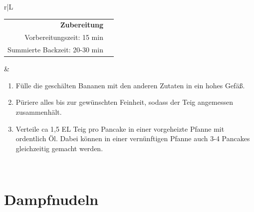 \documentclass[a4paper, 12pt]{scrbook} 								%
\numberwithin{equation}{section} 									%
\begin{document}
\begin{tabularx}{\textwidth}{r|L}
		
			\begin{tabular}[t]{rr}
				\textbf{Zubereitung}	\\
				\small Vorbereitungszeit: 15 min	\\
				\small Summierte Backzeit:	20-30 min		\\
			\end{tabular}			&	\begin{enumerate}[]
											\item Fülle die geschälten Bananen mit den anderen Zutaten in ein hohes Gefäß.
											\item Püriere alles bis zur gewünschten Feinheit, sodass der Teig angemessen zusammenhält.
											\item Verteile ca 1,5 EL Teig pro Pancake in einer vorgeheizte Pfanne mit ordentlich Öl. Dabei können in einer vernünftigen Pfanne auch 3-4 Pancakes gleichzeitig gemacht werden. 
										\end{enumerate}	\\
		\end{tabularx}
		\newpage


		\section{Dampfnudeln}	\label{dampfnudeln}
\end{document}
